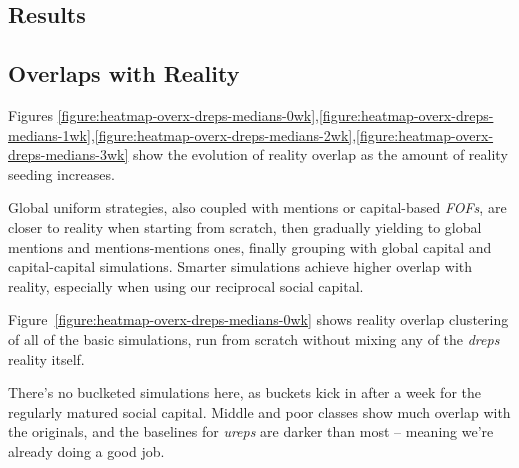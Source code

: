 \documentclass[10pt,oneside]{memoir}
\begin{document}
\begin{Spacing}{2}
\pagebreak \section{Results}
\label{results}

\label{section:simulation-results}


\subsection{Overlaps with Reality}
\label{overlapswithreality}

Figures \ref{figure:heatmap-overx-dreps-medians-0wk},\ref{figure:heatmap-overx-dreps-medians-1wk},\ref{figure:heatmap-overx-dreps-medians-2wk},\ref{figure:heatmap-overx-dreps-medians-3wk} show the evolution of reality overlap as the amount of reality seeding increases.  


Global uniform strategies, also coupled with mentions or capital-based {\itshape FOFs}, are closer to reality when starting from scratch, then gradually yielding to global mentions and mentions-mentions ones, finally grouping with global capital and capital-capital simulations.  Smarter simulations achieve higher overlap with reality, especially when using our reciprocal social capital.


Figure~\ref{figure:heatmap-overx-dreps-medians-0wk} shows reality overlap clustering of all of the basic simulations, run from scratch without mixing any of the {\itshape dreps} reality itself.


There's no buclketed simulations here, as buckets kick in after a week for the regularly matured social capital.  Middle and poor classes show much overlap with the originals, and the baselines for {\itshape ureps} are darker than most -- meaning we're already doing a good job.




\end{Spacing}
\end{document}
